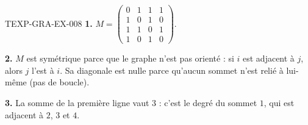\begin{corrige}{TEXP-GRA-EX-008}
\textbf{1.} $M=\begin{pmatrix}0&1&1&1\\1&0&1&0\\1&1&0&1\\1&0&1&0\end{pmatrix}$.

\textbf{2.} $M$ est symétrique parce que le graphe n'est pas orienté : si $i$
est adjacent à $j$, alors $j$ l'est à $i$. Sa diagonale est nulle parce
qu'aucun sommet n'est relié à lui-même (pas de boucle).

\textbf{3.} La somme de la première ligne vaut $3$ : c'est le degré du
sommet $1$, qui est adjacent à $2$, $3$ et $4$.
\end{corrige}

